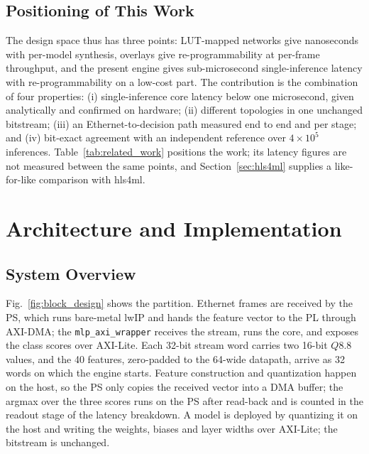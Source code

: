 \documentclass[pdflatex,sn-mathphys-num,iicol]{sn-jnl}
\begin{document}
\subsection{Positioning of This Work}
The design space thus has three points: LUT-mapped networks give nanoseconds
with per-model synthesis, overlays give re-programmability at per-frame
throughput, and the present engine gives sub-microsecond single-inference
latency with re-programmability on a low-cost part. The contribution is the
combination of four properties: (i) single-inference core
latency below one microsecond, given analytically and confirmed on hardware;
(ii) different topologies in one unchanged bitstream; (iii) an
Ethernet-to-decision path measured end to end and per stage; and (iv) bit-exact agreement
with an independent reference over $4\times10^{5}$ inferences.
Table~\ref{tab:related_work} positions the work; its latency figures are not
measured between the same points, and Section~\ref{sec:hls4ml} supplies a
like-for-like comparison with hls4ml.

\section{Architecture and Implementation}
\label{sec:framework}
\subsection{System Overview}
Fig.~\ref{fig:block_design} shows the partition. Ethernet frames are received
by the PS, which runs bare-metal lwIP and hands the feature vector to the PL
through AXI-DMA; the \texttt{mlp\_axi\_wrapper} receives the stream, runs the
core, and exposes the class scores over AXI-Lite. Each 32-bit stream word
carries two 16-bit $Q8.8$ values, and the 40 features, zero-padded to the
64-wide datapath, arrive as 32 words on which the engine starts. Feature
construction and quantization happen on the host, so the PS only copies the
received vector into a DMA buffer; the argmax over the three scores runs on the
PS after read-back and is counted in the readout stage of the latency
breakdown. A model is deployed by quantizing it on the host and writing the
weights, biases and layer widths over AXI-Lite; the bitstream is unchanged.
\end{document}

